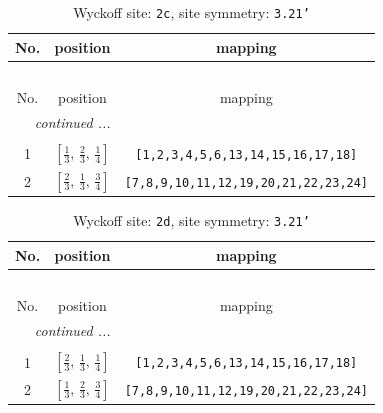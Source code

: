 \documentclass[fleqn,8pt]{jsarticle}
\begin{document}
\renewcommand{\arraystretch}{1.2}
\begin{longtable}{ccc}
\caption{Wyckoff site: {\tt 2c}, site symmetry: {\tt 3.21'}}
 \\
 \hline \hline
No. & position & mapping \\ \hline \endfirsthead

\multicolumn{2}{l}{\tablename\ \thetable{}} \\
 \hline \hline
No. & position & mapping \\ \hline \endhead

 \hline \hline
\multicolumn{2}{r}{\footnotesize\it continued ...} \\ \endfoot

 \hline \hline
\multicolumn{2}{r}{} \\ \endlastfoot

1 & $\left[ \frac{1}{3},\, \frac{2}{3},\, \frac{1}{4} \right]$ & {\tt [1,2,3,4,5,6,13,14,15,16,17,18]} \\ \hline
2 & $\left[ \frac{2}{3},\, \frac{1}{3},\, \frac{3}{4} \right]$ & {\tt [7,8,9,10,11,12,19,20,21,22,23,24]} \\
\end{longtable}
\renewcommand{\arraystretch}{1.2}
\begin{longtable}{ccc}
\caption{Wyckoff site: {\tt 2d}, site symmetry: {\tt 3.21'}}
 \\
 \hline \hline
No. & position & mapping \\ \hline \endfirsthead

\multicolumn{2}{l}{\tablename\ \thetable{}} \\
 \hline \hline
No. & position & mapping \\ \hline \endhead

 \hline \hline
\multicolumn{2}{r}{\footnotesize\it continued ...} \\ \endfoot

 \hline \hline
\multicolumn{2}{r}{} \\ \endlastfoot

1 & $\left[ \frac{2}{3},\, \frac{1}{3},\, \frac{1}{4} \right]$ & {\tt [1,2,3,4,5,6,13,14,15,16,17,18]} \\ \hline
2 & $\left[ \frac{1}{3},\, \frac{2}{3},\, \frac{3}{4} \right]$ & {\tt [7,8,9,10,11,12,19,20,21,22,23,24]} \\
\end{longtable}
\renewcommand{\arraystretch}{1.2}
\end{document}

